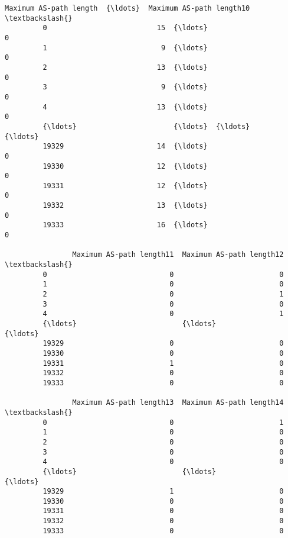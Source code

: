 \documentclass[11pt]{article}
\begin{document}
\begin{Verbatim}[commandchars=\\\{\}]
                Maximum AS-path length  {\ldots}  Maximum AS-path length10  \textbackslash{}
         0                          15  {\ldots}                         0   
         1                           9  {\ldots}                         0   
         2                          13  {\ldots}                         0   
         3                           9  {\ldots}                         0   
         4                          13  {\ldots}                         0   
         {\ldots}                       {\ldots}  {\ldots}                       {\ldots}   
         19329                      14  {\ldots}                         0   
         19330                      12  {\ldots}                         0   
         19331                      12  {\ldots}                         0   
         19332                      13  {\ldots}                         0   
         19333                      16  {\ldots}                         0   
         
                Maximum AS-path length11  Maximum AS-path length12  \textbackslash{}
         0                             0                         0   
         1                             0                         0   
         2                             0                         1   
         3                             0                         0   
         4                             0                         1   
         {\ldots}                         {\ldots}                       {\ldots}   
         19329                         0                         0   
         19330                         0                         0   
         19331                         1                         0   
         19332                         0                         0   
         19333                         0                         0   
         
                Maximum AS-path length13  Maximum AS-path length14  \textbackslash{}
         0                             0                         1   
         1                             0                         0   
         2                             0                         0   
         3                             0                         0   
         4                             0                         0   
         {\ldots}                         {\ldots}                       {\ldots}   
         19329                         1                         0   
         19330                         0                         0   
         19331                         0                         0   
         19332                         0                         0   
         19333                         0                         0   
         

\end{Verbatim}
\end{document}
